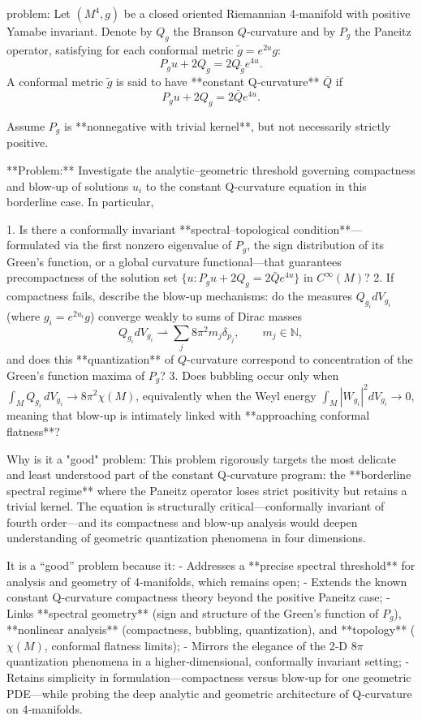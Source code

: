 problem:  
Let \((M^4,g)\) be a closed oriented Riemannian 4‑manifold with positive Yamabe invariant.  
Denote by \(Q_g\) the Branson \(Q\)‑curvature and by \(P_g\) the Paneitz operator, satisfying for each conformal metric \(\tilde g=e^{2u}g\):
\[
P_g u + 2Q_g = 2Q_{\tilde g} e^{4u}.
\]  
A conformal metric \(\tilde g\) is said to have **constant Q‑curvature** \(\bar Q\) if
\[
P_g u + 2Q_g = 2\bar Q e^{4u}.
\]

Assume \(P_g\) is **nonnegative with trivial kernel**, but not necessarily strictly positive.

**Problem:**  
Investigate the analytic–geometric threshold governing compactness and blow‑up of solutions \(u_i\) to the constant Q‑curvature equation in this borderline case. In particular,

1. Is there a conformally invariant **spectral–topological condition**—formulated via the first nonzero eigenvalue of \(P_g\), the sign distribution of its Green’s function, or a global curvature functional—that guarantees precompactness of the solution set \(\{u : P_g u + 2 Q_g = 2 \bar Q e^{4u}\}\) in \(C^\infty(M)\)?  
2. If compactness fails, describe the blow‑up mechanisms: do the measures \(Q_{g_i} dV_{g_i}\) (where \(g_i=e^{2u_i}g\)) converge weakly to sums of Dirac masses  
\[
Q_{g_i} dV_{g_i}\rightharpoonup \sum_j 8\pi^2 m_j \delta_{p_j}, \qquad m_j\in\mathbb N,
\]
and does this **quantization** of \(Q\)-curvature correspond to concentration of the Green’s function maxima of \(P_g\)?  
3. Does bubbling occur only when \(\int_M Q_{g_i}\,dV_{g_i} \to 8\pi^2\chi(M)\), equivalently when the Weyl energy \(\int_M |W_{g_i}|^2 dV_{g_i}\to 0\), meaning that blow‑up is intimately linked with **approaching conformal flatness**?

Why is it a "good" problem:  
This problem rigorously targets the most delicate and least understood part of the constant Q‑curvature program: the **borderline spectral regime** where the Paneitz operator loses strict positivity but retains a trivial kernel. The equation is structurally critical—conformally invariant of fourth order—and its compactness and blow‑up analysis would deepen understanding of geometric quantization phenomena in four dimensions.  

It is a “good” problem because it:  
- Addresses a **precise spectral threshold** for analysis and geometry of 4‑manifolds, which remains open;  
- Extends the known constant Q‑curvature compactness theory beyond the positive Paneitz case;  
- Links **spectral geometry** (sign and structure of the Green’s function of \(P_g\)), **nonlinear analysis** (compactness, bubbling, quantization), and **topology** (\(\chi(M)\), conformal flatness limits);  
- Mirrors the elegance of the 2‑D \(8\pi\) quantization phenomena in a higher‑dimensional, conformally invariant setting;  
- Retains simplicity in formulation—compactness versus blow‑up for one geometric PDE—while probing the deep analytic and geometric architecture of Q‑curvature on 4‑manifolds.